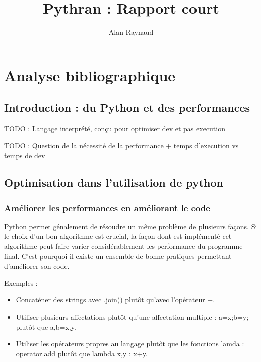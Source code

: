 \documentclass[a4paper]{article}
\title{Pythran : Rapport court}
\author{Alan Raynaud}
\date{}
\begin{document}

\maketitle                  

\tableofcontents            

\clearpage

\section{Analyse bibliographique}             

\subsection{Introduction : du Python et des performances}

TODO : Langage interprété, conçu pour optimiser dev et pas execution

TODO : Question de la nécessité de la performance + temps d'execution vs temps de dev

\subsection{Optimisation dans l'utilisation de python}

\label{OptCode}

\subsubsection{Améliorer les performances en améliorant le code}

Python permet génalement de résoudre un même problème de plusieurs façons. Si le choix d'un bon algorithme est crucial, la façon dont est implémenté cet algorithme peut faire varier considérablement les performance du programme final. C'est pourquoi il existe un ensemble de bonne pratiques permettant d'améliorer son code\cite{PythonSpeed}.

Exemples :
\begin{itemize}
\item Concaténer des strings avec .join() plutôt qu'avec l'opérateur +.
\item Utiliser plusieurs affectations plutôt qu'une affectation multiple : a=x;b=y; plutôt que a,b=x,y.
\item Utiliser les opérateurs propres au langage plutôt que les fonctions lamda : operator.add plutôt que lambda x,y : x+y.
\end{itemize}
\end{document}
